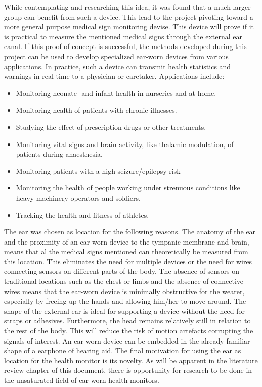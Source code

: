 \medskip

While contemplating and researching this idea, it was found that a much larger group can benefit from such a device. This lead to the project pivoting toward a more general purpose medical sign monitoring devise. This device will prove if it is practical to measure the mentioned medical signs through the external ear canal. If this proof of concept is successful, the methods developed during this project can be used to develop specialized ear-worn devices from various applications. In practice, such a device can transmit health statistics and warnings in real time to a physician or caretaker. Applications include:

\begin{itemize}
\item Monitoring neonate- and infant health in nurseries and at home.
\item Monitoring health of patients with chronic illnesses.
\item Studying the effect of prescription drugs or other treatments.
\item Monitoring vital signs and brain activity, like thalamic modulation, of patients during anaesthesia.
\item Monitoring patients with a high seizure/epilepsy risk
\item Monitoring the health of people working under strenuous conditions like heavy machinery operators and soldiers.
\item Tracking the health and fitness of athletes.
\end{itemize}

The ear was chosen as location for the following reasons. The anatomy of the ear and the proximity of an ear-worn device to the tympanic membrane and brain, means that al the medical signs mentioned can theoretically be measured from this location. This eliminates the need for multiple devices or the need for wires connecting sensors on different parts of the body. The absence of sensors on traditional locations such as the chest or limbs and the absence of connective wires means that the ear-worn device is minimally obstructive for the wearer, especially by freeing up the hands and allowing him/her to move around. The shape of the external ear is ideal for supporting a device without the need for straps or adhesives. Furthermore, the head remains relatively still in relation to the rest of the body. This will reduce the risk of motion artefacts corrupting the signals of interest. An ear-worn device can be embedded in the already familiar shape of a earphone of hearing aid. The final motivation for using the ear as location for the health monitor is its novelty. As will be apparent in the literature review chapter of this document, there is opportunity for research to be done in the unsaturated field of ear-worn health monitors.

